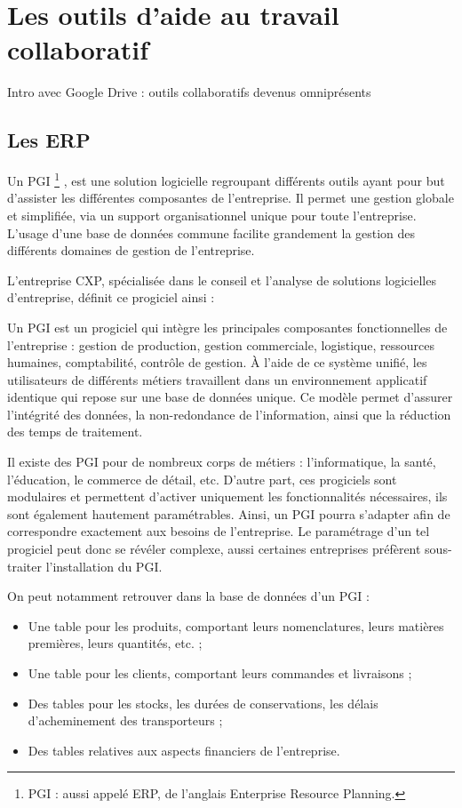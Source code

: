 \chapter{Les outils d'aide au travail collaboratif}

Intro avec Google Drive : outils collaboratifs devenus omniprésents

\section{Les ERP}

Un \gls{PGI} \footnote{PGI : aussi appelé ERP, de l'anglais Enterprise Resource Planning.} , est une solution logicielle regroupant différents outils ayant pour but d'assister les différentes composantes de l'entreprise. Il permet une gestion globale et simplifiée, via un support organisationnel unique pour toute l'entreprise. L'usage d'une base de données commune facilite grandement la gestion des différents domaines de gestion de l'entreprise.

L'entreprise CXP, spécialisée dans le conseil et l'analyse de solutions logicielles d'entreprise, définit ce progiciel ainsi :

\begin{Quote}
Un PGI est un progiciel qui intègre les principales composantes fonctionnelles de l'entreprise : gestion de production, gestion commerciale, logistique, ressources humaines, comptabilité, contrôle de gestion.
À l'aide de ce système unifié, les utilisateurs de différents métiers travaillent dans un environnement applicatif identique qui repose sur une base de données unique. Ce modèle permet d'assurer l'intégrité des données, la non-redondance de l'information, ainsi que la réduction des temps de traitement.
\end{Quote}

Il existe des PGI pour de nombreux corps de métiers : l'informatique, la santé, l'éducation, le commerce de détail, etc. D'autre part, ces progiciels sont modulaires et permettent d'activer uniquement les fonctionnalités nécessaires, ils sont également hautement paramétrables. Ainsi, un PGI pourra s'adapter afin de correspondre exactement aux besoins de l'entreprise. Le paramétrage d'un tel progiciel peut donc se révéler complexe, aussi certaines entreprises préfèrent sous-traiter l'installation du PGI.

On peut notamment retrouver dans la base de données d'un PGI :

\begin{itemize}
\item Une table pour les produits, comportant leurs nomenclatures, leurs matières premières, leurs quantités, etc. ;
\item Une table pour les clients, comportant leurs commandes et livraisons ;
\item Des tables pour les stocks, les durées de conservations, les délais d'acheminement des transporteurs ;
\item Des tables relatives aux aspects financiers de l'entreprise.
\end{itemize}

